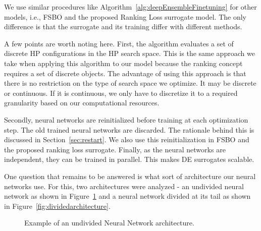 \documentclass[12pt, twoside, ngerman]{report}
\begin{document}
We use similar procedures like Algorithm~\ref{alg:deepEnsembleFinetuning} for other models, i.e., FSBO and the proposed Ranking Loss surrogate model.
The only difference is that the surrogate and its training differ with different methods.

A few points are worth noting here.
First, the algorithm evaluates a set of discrete HP configurations in the HP search space.
This is the same approach we take when applying this algorithm to our model because the ranking concept requires a set of discrete objects.
The advantage of using this approach is that there is no restriction on the type of search space we optimize.
It may be discrete or continuous.
If it is continuous,  we only have to discretize it to a required granularity based on our computational resources.

Secondly, neural networks are reinitialized before training at each optimization step.
The old trained neural networks are discarded.
The rationale behind this is discussed in Section~\ref{sec:restart}.
We also use this reinitialization in FSBO and the proposed ranking loss surrogate.
Finally, as the neural networks are independent,  they can be trained in parallel.
This makes DE surrogates scalable.

One question that remains to be answered is what sort of architecture our neural networks use.
For this, two architectures were analyzed - an undivided neural network as shown in Figure~\ref{fig:undividedarchitecture} and a neural network divided at its tail as shown in Figure~\ref{fig:dividedarchitecture}.

\begin{figure}[H]
\centering
{}
\caption{Example of an undivided Neural Network architecture.}
\label{fig:undividedarchitecture}
\end{figure}
\end{document}
